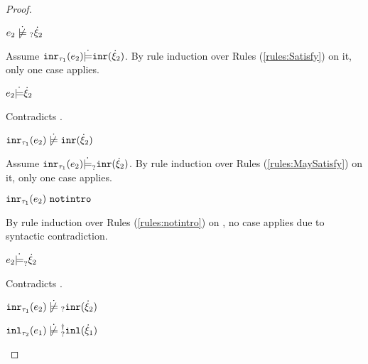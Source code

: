 \begin{proof}
\begin{byCases}
\begin{byCases}
\begin{byCases}
\begin{pfsteps*}
            \item $\cnotmaysatisfy{e_2}{\hxi_2}$  
            \end{pfsteps*}
            Assume $\mathtt{inr}_{\tau_1}({e_2}) \dot{\models} \mathtt{inr}(\dot{\xi}_2)$. By rule induction over Rules (\ref{rules:Satisfy}) on it, only one case applies.
            \begin{byCases}
            \item[\text{(\ref{rule:CSInr})}]
                \begin{pfsteps*}
                \item $e_2 \dot{\models} \dot{\xi}_2$
                \end{pfsteps*}
                Contradicts .
            \end{byCases}
            \begin{pfsteps*}
            \item $\cnotsatisfy{\hinr{\tau_1}{e_2}}{\cinr{\hxi_2}}$  
            \end{pfsteps*}
            Assume $\mathtt{inr}_{\tau_1}({e_2}) \dot{\models}_{?} \mathtt{inr}(\dot{\xi}_2)$. By rule induction over Rules (\ref{rules:MaySatisfy}) on it, only one case applies.
            \begin{byCases}
            \item[\text{(\ref{rule:CMSNotIntro})}]
                \begin{pfsteps*}
                \item $\mathtt{inr}_{\tau_1}({e_2}) ~\mathtt{notintro}$  
                \end{pfsteps*}
                By rule induction over Rules (\ref{rules:notintro}) on , no case applies due to syntactic contradiction.
            \item[\text{(\ref{rule:CMSInr})}]
                \begin{pfsteps*}
                \item $e_2 \dot{\models}_{?} \dot{\xi}_2$
                \end{pfsteps*}
                Contradicts .
            \end{byCases}
            \begin{pfsteps*}
            \item $\cnotmaysatisfy{\hinr{\tau_1}{e_2}}{\cinr{\hxi_2}}$  
            \item $\cnotsatisfyormay{\hinl{\tau_2}{e_1}}{\cinl{\hxi_1}}$ 
            \end{pfsteps*}
        \end{byCases}
    \end{byCases}


\end{byCases}
\end{proof}
